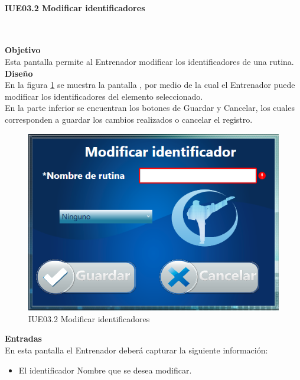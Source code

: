 \paragraph{IUE03.2 Modificar identificadores} \hspace{1cm}\\ 
\label{pant:IUE03.2} 

\textbf{\textcolor[rgb]{0, 0, 0.545098}{Objetivo}}\\
Esta pantalla permite al Entrenador modificar los identificadores de una rutina.\\

\textbf{\textcolor[rgb]{0, 0, 0.545098}{Diseño}}\\
En la figura \ref{fig:IUE03.2} se muestra la pantalla , por medio de la cual el Entrenador puede modificar los identificadores del elemento seleccionado.\\

En la parte inferior se encuentran los botones de Guardar y Cancelar, los cuales corresponden a guardar los cambios realizados o cancelar el registro.

\begin{figure}[H]
	\centering
		\includegraphics[scale=0.8]{./Figuras/Pantallas/IUE03_2Modificar_identificadores}
	\caption{IUE03.2 Modificar identificadores}
	\label{fig:IUE03.2}
\end{figure}

\textbf{\textcolor[rgb]{0, 0, 0.545098}{Entradas}}\\
En esta pantalla el Entrenador deberá capturar la siguiente información:

\begin{itemize}
	\item El identificador Nombre que se desea modificar.
\end{itemize}
\vspace{1em}

